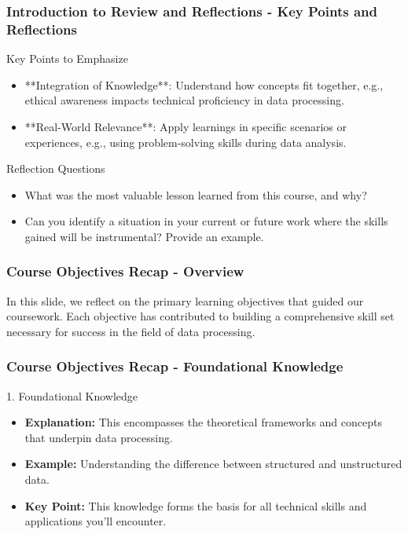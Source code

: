 \documentclass[aspectratio=169]{beamer}
\begin{document}
\begin{frame}[fragile]
    \frametitle{Introduction to Review and Reflections - Key Points and Reflections}
    \begin{block}{Key Points to Emphasize}
        \begin{itemize}
            \item **Integration of Knowledge**: Understand how concepts fit together, e.g., ethical awareness impacts technical proficiency in data processing.
            \item **Real-World Relevance**: Apply learnings in specific scenarios or experiences, e.g., using problem-solving skills during data analysis.
        \end{itemize}
    \end{block}
    
    \begin{block}{Reflection Questions}
        \begin{itemize}
            \item What was the most valuable lesson learned from this course, and why?
            \item Can you identify a situation in your current or future work where the skills gained will be instrumental? Provide an example.
        \end{itemize}
    \end{block}
\end{frame}

\begin{frame}[fragile]
    \frametitle{Course Objectives Recap - Overview}
    In this slide, we reflect on the primary learning objectives that guided our coursework. Each objective has contributed to building a comprehensive skill set necessary for success in the field of data processing.
\end{frame}

\begin{frame}[fragile]
    \frametitle{Course Objectives Recap - Foundational Knowledge}
    \begin{block}{1. Foundational Knowledge}
        \begin{itemize}
            \item \textbf{Explanation:} This encompasses the theoretical frameworks and concepts that underpin data processing.
            \item \textbf{Example:} Understanding the difference between structured and unstructured data.
            \item \textbf{Key Point:} This knowledge forms the basis for all technical skills and applications you'll encounter.
        \end{itemize}
    \end{block}
\end{frame}
\end{document}

